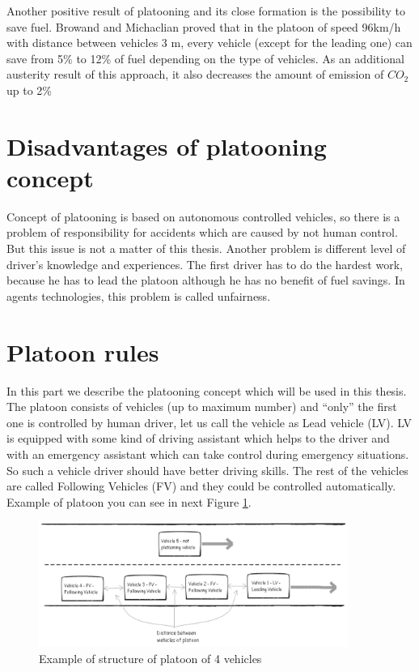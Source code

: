 Another positive result of platooning and its close formation is the possibility to save fuel. Browand and Michaclian\cite{zabat1995estimates}\cite{browand2000platoon} proved that in the platoon of speed 96km/h with distance between vehicles 3 m, every vehicle (except for the leading one) can save from 5\% to 12\% of fuel depending on the type of vehicles. As an additional austerity result of this approach, it also decreases the amount of emission of $CO_{2}$ up to 2\%

\section{Disadvantages of platooning concept}

Concept of platooning is based on autonomous controlled vehicles, so there is a problem of responsibility for accidents which are caused by not human control. But this issue is not a matter of this thesis. Another problem is different level of driver’s knowledge and experiences. The first driver has to do the hardest work, because he has to lead the platoon  although he has no benefit of fuel savings. In agents technologies, this problem is called unfairness.

\section{Platoon rules}

In this part we describe the platooning concept which will be used in this thesis. The platoon consists of vehicles (up to maximum number) and “only” the first one is controlled by human driver, let us call the vehicle as Lead vehicle (LV). LV is equipped with some kind of driving assistant which helps to the driver and with an emergency assistant which can take control during emergency situations. So such a vehicle driver should have better driving skills. The rest of the vehicles are called Following Vehicles (FV) and they could be controlled automatically. Example of platoon you can see in next Figure \ref{fig:3_5-1}.

\begin{figure}[!htpb]
\centering
\includegraphics[width=0.90\textwidth,height=0.90\textheight,keepaspectratio]{figures/Chapter_3/3_platoonin_example.png}
\centering
\protect\caption{\label{fig:3_5-1}Example of structure of platoon of 4 vehicles}
\end{figure}


